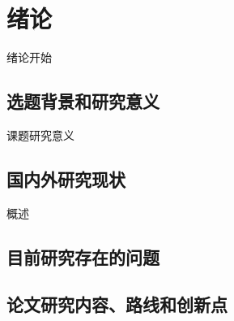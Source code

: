 \chapter{绪论}
\label{chap:introduction}

绪论开始

\section{选题背景和研究意义}

课题研究意义




\section{国内外研究现状}

概述




\section{目前研究存在的问题}




\section{论文研究内容、路线和创新点}